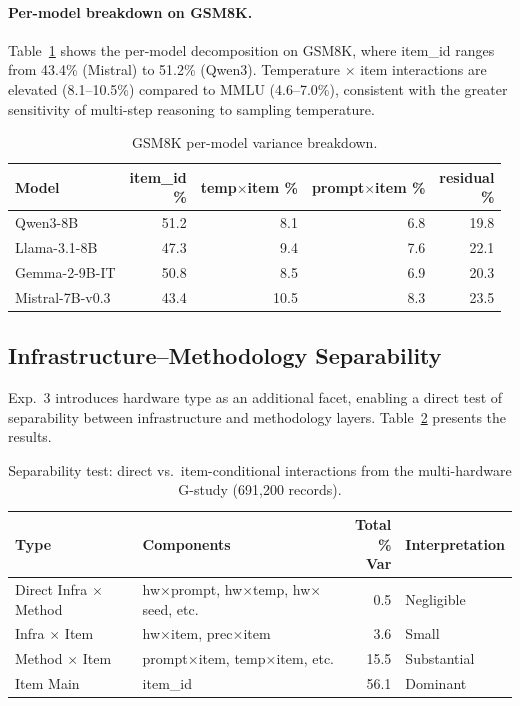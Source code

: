 \documentclass[letterpaper,11pt]{article}
\begin{document}
\paragraph{Per-model breakdown on GSM8K.}
Table~\ref{tab:gsm8k_permodel} shows the per-model decomposition on GSM8K, where item\_id ranges from 43.4\% (Mistral) to 51.2\% (Qwen3).
Temperature $\times$ item interactions are elevated (8.1--10.5\%) compared to MMLU (4.6--7.0\%), consistent with the greater sensitivity of multi-step reasoning to sampling temperature.

\begin{table}[t]
\centering
\caption{GSM8K per-model variance breakdown.}
\label{tab:gsm8k_permodel}
\small
\begin{tabular}{lrrrr}
\toprule
Model & \makecell{item\_id \\ \%} & \makecell{temp$\times$item \\ \%} & \makecell{prompt$\times$item \\ \%} & \makecell{residual \\ \%} \\
\midrule
Qwen3-8B & 51.2 & 8.1 & 6.8 & 19.8 \\
Llama-3.1-8B & 47.3 & 9.4 & 7.6 & 22.1 \\
Gemma-2-9B-IT & 50.8 & 8.5 & 6.9 & 20.3 \\
Mistral-7B-v0.3 & 43.4 & 10.5 & 8.3 & 23.5 \\
\bottomrule
\end{tabular}
\end{table}

\subsection{Infrastructure--Methodology Separability}

Exp.~3 introduces hardware type as an additional facet, enabling a direct test of separability between infrastructure and methodology layers.
Table~\ref{tab:separability} presents the results.

\begin{table}[t]
\centering
\caption{Separability test: direct vs.\ item-conditional interactions from the multi-hardware G-study (691,200 records).}
\label{tab:separability}
\small
\begin{tabular}{p{2.1cm}p{2.5cm}rp{1.5cm}}
\toprule
Type & Components & \makecell{Total \\ \% Var} & Interpretation \\
\midrule
Direct Infra $\times$ Method & hw$\times$prompt, hw$\times$temp, hw$\times$seed, etc. & 0.5 & Negligible \\
\addlinespace
Infra $\times$ Item & hw$\times$item, prec$\times$item & 3.6 & Small \\
\addlinespace
Method $\times$ Item & prompt$\times$item, temp$\times$item, etc. & 15.5 & Substantial \\
\addlinespace
Item Main & item\_id & 56.1 & Dominant \\
\bottomrule
\end{tabular}
\end{table}
\end{document}
